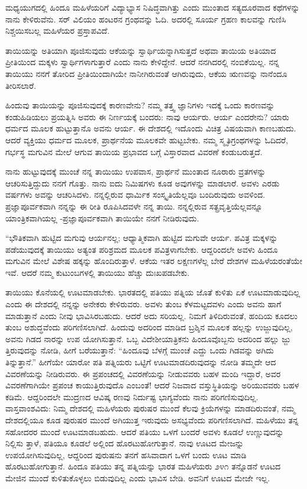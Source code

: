 ಮಧ್ಯಯುಗದಲ್ಲಿ ಹಿಂದೂ ಮಹಿಳೆಯರಿಗೆ ವಿದ್ಯಾಭ್ಯಾಸ ನಿಷಿದ್ಧವಾಗಿತ್ತು ಎಂದು ಮುಂತಾದ ಸತ್ಯದೂರವಾದ ಕಥೆಗಳನ್ನು ನಾನು ಕೇಳಿರುವೆನು. ಸರ್ ವಿಲಿಯಂ ಹಂಟರನ  ಗ್ರಂಥವನ್ನು ಓದಿ. ಅದರಲ್ಲಿ ಸೂರ್ಯ ಗ್ರಹಣ ಕಾಲವನ್ನು ಗುಣಿಸಿ ನಿಶ್ಚಯಿಸಬಲ್ಲ ಮಹಿಳೆಯರ ಪ್ರಸ್ತಾಪವಿದೆ.

ತಾಯಿಯನ್ನು ಅತಿಯಾಗಿ ಪೂಜಿಸುವುದು ಆಕೆಯನ್ನು ಸ್ವಾರ್ಥಿಯನ್ನಾಗಿಸುತ್ತದೆ ಅಥವಾ ತಾಯಿಯ ಅತಿಯಾದ ಪ್ರೀತಿಯಿಂದ ಮಕ್ಕಳು ಸ್ವಾರ್ಥಿಗಳಾಗುತ್ತಾರೆ ಎಂದು ನಾನು ಕೇಳಿದ್ದೇನೆ. ಆದರೆ ನನಗಿದರಲ್ಲಿ ನಂಬಿಕೆಯಿಲ್ಲ. ನನ್ನ ತಾಯಿಯು ನನಗೆ ತೋರಿದ ಪ್ರೀತಿಯಿಂದಾಗಿಯೇ ನಾನೀಗಿರುವಂತೆ ಆಗಿರುವುದು, ಆಕೆಯ ಋಣವನ್ನು ನಾನೆಂದೂ ತೀರಿಸಲಾರೆ.

ಹಿಂದುವು ತಾಯಿಯನ್ನು ಪೂಜಿಸುವುದಕ್ಕೆ ಕಾರಣವೇನು? ನಮ್ಮ ತತ್ತ್ವ ಜ್ಞಾನಿಗಳು ಇದಕ್ಕೆ ಒಂದು ಕಾರಣವನ್ನು ಕಂಡುಹಿಡಿಯಲು ಪ್ರಯತ್ನಿಸಿ ಅವರು ಈ ನಿರ್ಣಯಕ್ಕೆ ಬಂದರು: ನಾವು ಆರ್ಯರು. ಆರ್ಯ ಎಂದರೇನು? ಯಾರು ಧರ್ಮದ ಮೂಲಕ ಹುಟ್ಟುತ್ತಾನೊ ಅವನು ಆರ್ಯ. ಈ ದೇಶದಲ್ಲಿ ಇದೊಂದು ವಿಚಿತ್ರ ವಿಷಯವಾಗಿ ಕಾಣಬಹುದು. ಆದರೆ ವ್ಯಕ್ತಿಯು ಧರ್ಮದ ಮೂಲಕ, ಪ್ರಾರ್ಥನೆಯ ಮೂಲಕವೇ ಹುಟ್ಟಬೇಕು. ನಮ್ಮ ಸ್ಮೃತಿಗ್ರಂಥಗಳನ್ನು ಓದಿದರೆ, ಗರ್ಭಸ್ಥ ಮಗುವಿನ ಮೇಲೆ ಆಗುವ ತಾಯಿಯ ಪ್ರಭಾವದ ಬಗ್ಗೆ ವಿಸ್ತಾರವಾದ ವಿವರಣೆ ಕಂಡುಬರುತ್ತದೆ.

ನಾನು ಹುಟ್ಟುವುದಕ್ಕೆ ಮುಂಚೆ ನನ್ನ ತಾಯಿಯು ಉಪವಾಸ, ಪ್ರಾರ್ಥನೆ ಮುಂತಾದ ನೂರಾರು ವ್ರತಗಳನ್ನು ಆಚರಿಸುತ್ತಿದ್ದುದು ನನಗೆ ಗೊತ್ತು. ನಾನು ಐದು ನಿಮಿಷಗಳು ಕೂಡ ಅವುಗಳನ್ನು ಮಾಡಲಾರೆ. ಅವಳು ಎರಡು ವರ್ಷಗಳು ಅವನ್ನು ಆಚರಿಸಿದಳು. ನನ್ನಲ್ಲಿರುವ ಧಾರ್ಮಿಕ ಸಂಸ್ಕೃತಿಯೆಲ್ಲವೂ ಬಂದಿರುವುದು ಅವಳಿಂದ. ಪ್ರಜ್ಞಾಪೂರ್ವಕವಾಗಿ ನನ್ನನ್ನು ಈ ರೀತಿ ರೂಪಿಸಿದವಳೇ ನನ್ನ ತಾಯಿ. ನನ್ನಲ್ಲಿರುವ ಸತ್ಪ್ರವೃತ್ತಿಯೆಲ್ಲವನ್ನೂ ಯಾಂತ್ರಿಕವಾಗಿಯಲ್ಲ -ಪ್ರಜ್ಞಾಪೂರ್ವಕವಾಗಿ ತಾಯಿಯೇ ನನಗೆ ನೀಡಿರುವುದು.

“ಭೌತಿಕವಾಗಿ ಹುಟ್ಟಿದ ಮಗುವು ಆರ್ಯನಲ್ಲ; ಆಧ್ಯಾತ್ಮಿಕವಾಗಿ ಹುಟ್ಟಿದ ಮಗುವೇ ಆರ್ಯ. ಪವಿತ್ರ ಮಕ್ಕಳನ್ನು ಪಡೆಯುವುದಕ್ಕೆ ತಾಯಿಯು ಅತ್ಯಂತ ಪರಿಶ್ರಮದ ಮೂಲಕ ಪವಿತ್ರಳಾಗಬೇಕು. ಆದ್ದರಿಂದಲೇ ಅವಳು ಹಿಂದೂ ಮಗುವಿನ ಮೇಲೆ ವಿಶೇಷ ಹಕ್ಕನ್ನು ಹೊಂದಿರುತ್ತಾಳೆ. ಆಕೆಯ ಇತರ ಲಕ್ಷಣಗಳೆಲ್ಲ ಬೇರೆ ದೇಶಗಳ ಮಹಿಳೆಯರಂತೆಯೇ ಇವೆ. ಆದರೆ ನಮ್ಮ ಕುಟುಂಬಗಳಲ್ಲಿ ತಾಯಿಯು ಹೆಚ್ಚು ದುಃಖಪಡಬೇಕು.

ತಾಯಿಯು ಕೊನೆಯಲ್ಲಿ ಊಟಮಾಡಬೇಕು. ಭಾರತದಲ್ಲಿ ಪತಿಯು ಪತ್ನಿಯ ಜೊತೆ ಕುಳಿತು ಏಕೆ ಊಟಮಾಡುವುದಿಲ್ಲ ಎಂದು ಈ ದೇಶದಲ್ಲಿ ನನ್ನನ್ನು ಅನೇಕರು ಕೇಳಿರುವರು. ಅವಳು ತುಂಬ ಕೆಳಮಟ್ಟದವಳು ಎಂದು ಅವನು ಹಾಗೆ ಮಾಡುತ್ತಾನೆ ಎಂದು ನೀವು ಭಾವಿಸಿರಬಹುದು. ಆದರೆ ಅದು ಸರಿಯಲ್ಲ. ನಿಮಗೆ ತಿಳಿದಿರುವಂತೆ, ಹಂದಿಯ ಕೂದಲು ತುಂಬ ಅಶುದ್ಧವೆಂದು ಪರಿಗಣಿಸಲಾಗಿದೆ. ಹಿಂದುವು ಅದರಿಂದ ಮಾಡಿದ ಬ್ರಶ್ಶಿನ ಮೂಲಕ ಹಲ್ಲನ್ನು ಉಜ್ಜುವುದಿಲ್ಲ, ಅವನು ಗಿಡದ ನಾರನ್ನು ಉಪ ಯೋಗಿಸುತ್ತಾನೆ. ಒಬ್ಬ ವಿದೇಶೀಯಾತ್ರಿಕನು ಹಿಂದೂವೊಬ್ಬನು ಅದರಿಂದ ಹಲ್ಲು ಜ್ಜು ತ್ತಿರುವುದನ್ನು ನೋಡಿ, ಹೀಗೆ ಬರೆಯುತ್ತಾನೆ: “ಹಿಂದೂವು ಬೆಳಗ್ಗೆ ಮುಂಚೆ ಎದ್ದು ಒಂದು ಗಿಡವನ್ನು ಅಗಿದು ತಿನ್ನುತ್ತಾನೆ.” ಹೀಗೆಯೇ ಯಾರೋ ಪತಿ ಪತ್ನಿಯರು ಒಟ್ಟಿಗೆ ಊಟಮಾಡದಿರುವುದನ್ನು ನೋಡಿ ತಮ್ಮದೇ ಆದ ವಿವರಣೆಯನ್ನು ನೀಡಿರುವರು. ಈ ಪ್ರಪಂಚದಲ್ಲಿ ವಿವರಣೆಯನ್ನು ನೀಡುವವರು ಬಹಳ ಮಂದಿ ಇದ್ದಾರೆ, ಅವರ ವಿವರಣೆಗಾಗಿಯೇ ಪ್ರಪಂಚ ಕಾಯುತ್ತಿರುವುದೊ ಎಂಬಂತೆ! ಆದರೆ ನಿಜವಾದ ವಸ್ತುಸ್ಥಿತಿಯನ್ನು ಅರಿಯುವವರು ಬಹಳ ಕಡಿಮೆ. ಆದ್ದರಿಂದಲೇ ಮುದ್ರಣದ ಆವಿಷ್ಕ ರಣವು ನಿರ್ದುಷ್ಟ ಭಾಗ್ಯವೆಂದು ನಾನು ಪರಿಗಣಿಸುವುದಿಲ್ಲ. ವಾಸ್ತವಾಂಶವಿದು: ನಿಮ್ಮ ದೇಶದಲ್ಲಿ ಮಹಿಳೆಯರು ಪುರುಷರ ಮುಂದೆ ಕೆಲವು ಕ್ರಿಯೆಗಳನ್ನು ಮಾಡದಿರುವಂತೆ, ನಮ್ಮ ದೇಶದಲ್ಲಿಯೂ ಕೂಡ ಪುರುಷರ ಮುಂದೆ ಅಗಿಯುತ್ತ ಇರುವುದು ಅಸಭ್ಯವೆಂದು ಪರಿಗಣಿಸಲಾಗಿದೆ. ಮಹಿಳೆಯು ತನ್ನ ಸಹೋದರರ ಮುಂದೆ ಊಟಮಾಡಬಹುದು. ಆದರೆ ಪತಿಯು ಒಳಗೆ ಬಂದರೆ ಅವಳು ಕೂಡಲೆ ಉಣ್ಣುವುದನ್ನು ನಿಲ್ಲಿಸು ತ್ತಾಳೆ, ಪತಿಯೂ ಕೂಡಲೆ ಅಲ್ಲಿಂದ ಹೊರಟುಹೋಗುತ್ತಾನೆ. ನಾವು ಊಟದ ಮೇಜನ್ನು ಉಪಯೋಗಿಸುವುದಿಲ್ಲ, ಆದ್ದರಿಂದ ಪುರುಷನು ತನಗೆ ಹಸಿವಾದಾಗ ಒಳಗೆ ಬಂದು ಊಟ ಮಾಡಿ ಹೊರಟುಹೋಗುತ್ತಾನೆ. ಹಿಂದೂ ಪತಿಯು ತನ್ನ ಪತ್ನಿಯನ್ನು ಭಾರತ ಮಹಿಳೆಯರು ೨೪೧ ತನ್ನೊಡನೆ ಊಟದ ಮೇಜಿನ ಮುಂದೆ ಕುಳಿತುಕೊಳ್ಳಲು ಬಿಡುವುದಿಲ್ಲ ಎಂದು ಭಾವಿಸ ಬೇಡಿ. ಅವನಿಗೆ ಊಟದ ಮೇಜೇ ಇಲ್ಲ.

